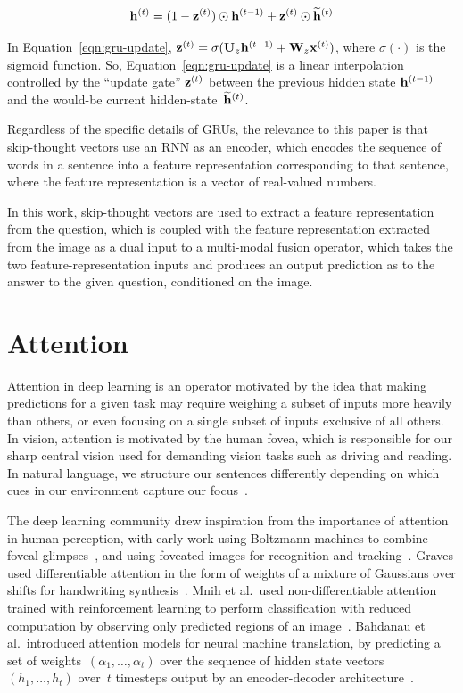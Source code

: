 \begin{equation}
        \mathbf{h}^{(t)} = (1 - \mathbf{z}^{(t)}) \odot \mathbf{h}^{(t - 1)} + \mathbf{z}^{(t)} \odot \mathbf{\widetilde{h}}^{(t)}
\label{eqn:gru-update}
\end{equation}

In Equation~\ref{eqn:gru-update},
$\mathbf{z}^{(t)} = \sigma(\mathbf{U}_z\mathbf{h}^{(t - 1)} + \mathbf{W}_z\mathbf{x}^{(t)})$,
where $\sigma(\cdot)$ is the sigmoid function. So,
Equation~\ref{eqn:gru-update} is a linear interpolation controlled by the
``update gate'' $\mathbf{z}^{(t)}$ between the previous hidden state
$\mathbf{h}^{(t - 1)}$ and the would-be current
hidden-state~$\mathbf{\widetilde{h}}^{(t)}$.

Regardless of the specific details of GRUs, the relevance to this paper is that
skip-thought vectors use an RNN as an encoder, which encodes the sequence
of words in a sentence into a feature representation corresponding to that
sentence, where the feature representation is a vector of real-valued numbers.

In this work, skip-thought vectors are used to extract a feature representation
from the question, which is coupled with the feature representation extracted
from the image as a dual input to a multi-modal fusion operator, which takes
the two feature-representation inputs and produces an output prediction as to
the answer to the given question, conditioned on the image.


\section{Attention}

Attention in deep learning is an operator motivated by the idea that making
predictions for a given task may require weighing a subset of inputs more
heavily than others, or even focusing on a single subset of inputs exclusive of
all others.
In vision, attention is motivated by the human fovea, which is responsible for
our sharp central vision used for demanding vision tasks such as driving and
reading.
In natural language, we structure our sentences differently depending on which
cues in our environment capture our focus~\cite{myachykov2005attention}.

The deep learning community drew inspiration from the importance of attention
in human perception, with early work using Boltzmann machines to combine foveal
glimpses~\cite{larochelle2010learning}, and using foveated images for
recognition and tracking~\cite{denil2012learning}.
Graves used differentiable attention in the form of weights of a mixture of
Gaussians over shifts for handwriting synthesis~\cite{graves2013generating}.
Mnih et al.\ used non-differentiable attention trained with reinforcement
learning to perform classification with reduced computation by observing only
predicted regions of an image~\cite{mnih2014recurrent}.
Bahdanau et al.\ introduced attention models for neural machine translation,
by predicting a set of weights~$(\alpha_1, \dots, \alpha_t)$ over the sequence
of hidden state vectors~$(h_1, \dots, h_t)$ over~$t$ timesteps output by an
encoder-decoder architecture~\cite{cho2014ontheproperties}.

